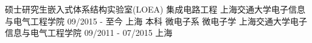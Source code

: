

\begin{cventries}

  \cventry
    {\hspace{0.75cm}硕士研究生\hspace{0.25cm}嵌入式体系结构实验室(LOEA)\hspace{0.25cm} 集成电路工程} %
    {上海交通大学\hspace{0.1cm}电子信息与电气工程学院} %
    {09/2015 - 至今} %
    {上海} %
    {
    }
    \vspace{-8pt}
    \cventry
    {\hspace{0.7cm}本科	\hspace{0.25cm}	微电子系\hspace{0.25cm} 微电子学} %
    {上海交通大学\hspace{0.1cm}电子信息与电气工程学院} %
    {09/2011 - 07/2015} %
    {上海} %
    {
    }


\end{cventries}
